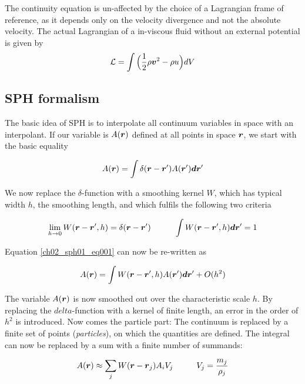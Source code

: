 The continuity equation is un-affected by the choice of a Lagrangian frame of reference, as it depends only on the velocity divergence and not the absolute velocity. The actual Lagrangian of a in-viscous fluid without an external potential is given by
\begin{equation}
\label{ch02_fld01_eq004}
\mathcal{L} = \int \Big( \frac{1}{2} \rho \boldsymbol{v} ^2 - \rho u \Big) dV
\end{equation}

\subsection{SPH formalism}
The basic idea of SPH is to interpolate all continuum variables in space with an interpolant.
If our variable is $A(\boldsymbol{r})$ defined at all points in space $\boldsymbol{r}$, we start with the basic equality

\begin{equation}
\label{ch02_sph01_eq001}
A(\boldsymbol{r}) = \int  \delta(\boldsymbol{r} - \boldsymbol{r}') A(\boldsymbol{r}') \boldsymbol{d} \boldsymbol{r}'
\end{equation}

We now replace the $\delta$-function with a smoothing kernel $W$, which has typical width $h$, the smoothing length, and which fulfils the following two criteria

\begin{equation}
\label{ch02_sph01_eq002}
\lim_{h \to 0} W(\boldsymbol{r} - \boldsymbol{r}', h) = \delta(\boldsymbol{r} - \boldsymbol{r}') \hspace{1.0cm}
\int W(\boldsymbol{r} - \boldsymbol{r}', h) \boldsymbol{d} \boldsymbol{r}' = 1
\end{equation}

Equation \ref{ch02_sph01_eq001} can now be re-written as 

\begin{equation}
\label{ch02_sph01_eq003}
A(\boldsymbol{r}) = \int  W(\boldsymbol{r} - \boldsymbol{r}', h) A(\boldsymbol{r}') \boldsymbol{d} \boldsymbol{r}' + O(h^2)
\end{equation}

The variable $A(\boldsymbol{r})$ is now smoothed out over the characteristic scale $h$. By replacing the $delta$-function with a kernel of finite length, an error in the order of $h^2$ is introduced. Now comes the particle part: The continuum is replaced by a finite set of points (\emph{particles}), on which the quantities are defined. The integral can now be replaced by a sum with a finite number of summands:

\begin{equation}
\label{ch02_sph01_eq004}
A(\boldsymbol{r}) \approx \sum_{j} W(\boldsymbol{r} - \boldsymbol{r}_{j}) A_i V_{j} \hspace{1.0cm} V_{j} = \frac{m_j}{\rho_j}
\end{equation}

